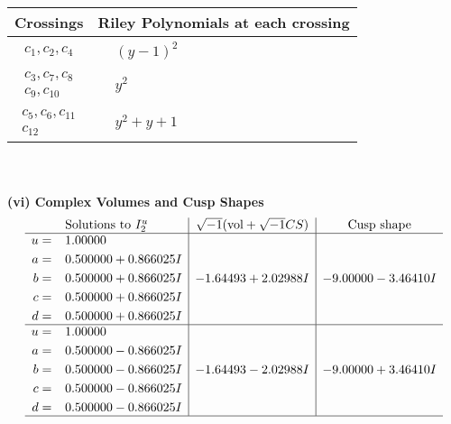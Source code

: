 \documentclass[1p]{elsarticle_modified}
\theoremstyle{definition}
\newcommand{\I}{\sqrt{-1}}
\begin{document}
\begin{tabular}{m{50pt}|m{274pt}}
Crossings & \hspace{64pt}Riley Polynomials at each crossing \\
\hline $$\begin{aligned}c_{1},c_{2},c_{4}\end{aligned}$$&$\begin{aligned}
&(y-1)^2
\end{aligned}$\\
\hline $$\begin{aligned}c_{3},c_{7},c_{8}\\c_{9},c_{10}\end{aligned}$$&$\begin{aligned}
&y^2
\end{aligned}$\\
\hline $$\begin{aligned}c_{5},c_{6},c_{11}\\c_{12}\end{aligned}$$&$\begin{aligned}
&y^2+y+1
\end{aligned}$\\
\hline
\end{tabular}\\~\\
\newpage\flushleft \textbf{(vi) Complex Volumes and Cusp Shapes}
$$\begin{array}{c|c|c}  
\text{Solutions to }I^u_{2}& \I (\text{vol} + \sqrt{-1}CS) & \text{Cusp shape}\\
 \hline 
\begin{aligned}
u &= \phantom{-}1.00000\phantom{ +0.000000I} \\
a &= \phantom{-}0.500000 + 0.866025 I \\
b &= \phantom{-}0.500000 + 0.866025 I \\
c &= \phantom{-}0.500000 + 0.866025 I \\
d &= \phantom{-}0.500000 + 0.866025 I\end{aligned}
 & -1.64493 + 2.02988 I & -9.00000 - 3.46410 I \\ \hline\begin{aligned}
u &= \phantom{-}1.00000\phantom{ +0.000000I} \\
a &= \phantom{-}0.500000 - 0.866025 I \\
b &= \phantom{-}0.500000 - 0.866025 I \\
c &= \phantom{-}0.500000 - 0.866025 I \\
d &= \phantom{-}0.500000 - 0.866025 I\end{aligned}
 & -1.64493 - 2.02988 I & -9.00000 + 3.46410 I\\
 \hline 
 \end{array}$$\newpage\newpage\renewcommand{\arraystretch}{1}
\end{document}
